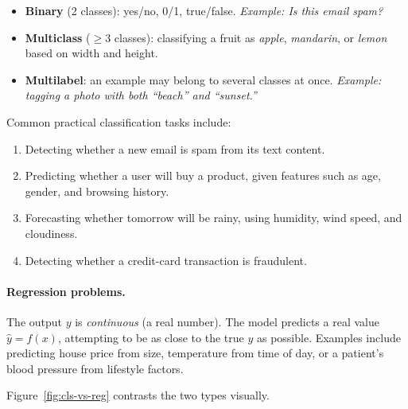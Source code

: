 \begin{itemize}
\item \textbf{Binary} (2 classes): yes/no, 0/1, true/false.
  \emph{Example: Is this email spam?}
\item \textbf{Multiclass} ($\ge3$ classes): classifying a fruit as
  \emph{apple}, \emph{mandarin}, or \emph{lemon} based on width and height.
\item \textbf{Multilabel}: an example may belong to several classes at once.
  \emph{Example: tagging a photo with both ``beach'' and ``sunset.''}
\end{itemize}

Common practical classification tasks include:
\begin{enumerate}
\item Detecting whether a new email is spam from its text content.
\item Predicting whether a user will buy a product, given features such as age,
  gender, and browsing history.
\item Forecasting whether tomorrow will be rainy, using humidity, wind speed,
  and cloudiness.
\item Detecting whether a credit-card transaction is fraudulent.
\end{enumerate}

\paragraph{Regression problems.}
The output $y$ is \emph{continuous} (a real number). The model predicts a real
value $\hat{y} = f(x)$, attempting to be as close to the true $y$ as possible.
Examples include predicting house price from size, temperature from time of day,
or a patient's blood pressure from lifestyle factors.

Figure~\ref{fig:cls-vs-reg} contrasts the two types visually.

